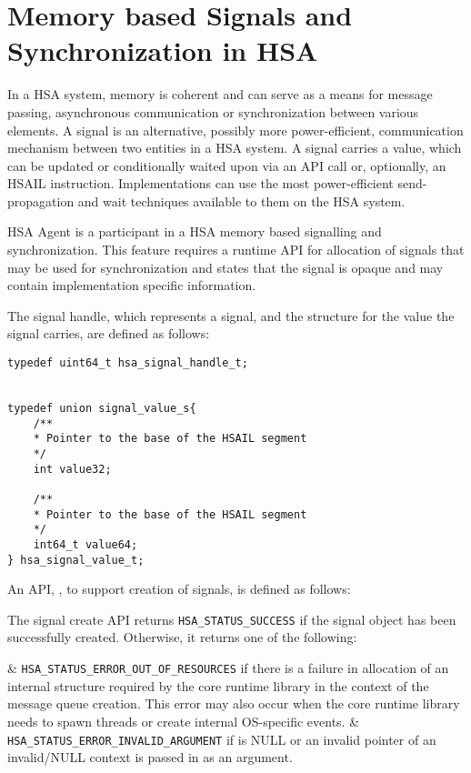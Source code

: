 \hypertarget{signals}{}\section{Memory based Signals and
Synchronization in H\-S\-A}\label{signals}

In a HSA system, memory is coherent and can serve as a means for
message passing, asynchronous communication or synchronization
between various elements.  A signal is an alternative, possibly more
power-efficient, communication mechanism between two entities in a
H\-S\-A system. A signal carries a value, which can be updated or
conditionally waited upon via an API call or, optionally, an HSAIL
instruction. 
Implementations can use the most power-efficient send-propagation
and wait techniques available to them on the HSA system.  

HSA Agent is a
participant in a HSA memory based signalling and synchronization.
This feature requires a
runtime API for allocation of signals that may be used for
synchronization and states that the signal is opaque and may contain
implementation specific information.  

The signal handle, which represents a signal, and the structure for
the value the signal carries, are defined as follows:

\begin{lstlisting}
typedef uint64_t hsa_signal_handle_t;


typedef union signal_value_s{
    /**
    * Pointer to the base of the HSAIL segment
    */
    int value32;

    /**
    * Pointer to the base of the HSAIL segment
    */
    int64_t value64;
} hsa_signal_value_t;
\end{lstlisting}

An API, , to support
creation of signals, is defined as follows:



The signal create API returns \texttt{HSA\_STATUS\_SUCCESS} if the
signal object has been successfully created. Otherwise, it returns
one of the following:

\begin{easylist}
& \texttt{HSA\_STATUS\_ERROR\_OUT\_OF\_RESOURCES} if there is a failure
in allocation of an internal structure required by the core runtime
library in the context of the message queue creation. This error may
also occur when the core runtime library needs to spawn threads or
create internal OS-specific events. 
& \texttt{HSA\_STATUS\_ERROR\_INVALID\_ARGUMENT} if {\itshape
{}} is NULL or an invalid pointer of an invalid/NULL
context is passed in as an argument.
\end{easylist}

